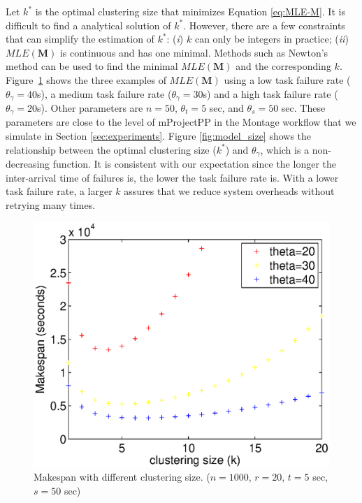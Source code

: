\documentclass{IOS-Book-Article}
\begin{document}
Let $k^*$ is the optimal clustering size that minimizes Equation \ref{eq:MLE-M}.  It is difficult to find a analytical solution of $k^*$. However, there are a few constraints that can simplify the estimation of $k^*$: (\emph{i}) $k$ can only be integers in practice; (\emph{ii}) $MLE(\bm{M})$ is continuous and has one minimal. Methods such as Newton's method can be used to find the minimal $MLE(\bm{M})$ and the corresponding $k$. Figure~\ref{fig:model_makespan} shows the three examples of $MLE(\bm{M})$ using a low task failure rate ($\theta_{\gamma}=40$s), a medium task failure rate ($\theta_{\gamma}=30$s) and a high task failure rate ($\theta_{\gamma}=20$s). Other parameters are $n=50$, $\theta_{t}=5$ sec, and $\theta_{s}=50$ sec. These parameters are close to the level of mProjectPP in the Montage workflow that we simulate in Section \ref{sec:experiments}. 
Figure \ref{fig:model_size} shows the relationship between the optimal clustering size ($k^*$) and $\theta_{\gamma}$, which is a non-decreasing function. It is consistent with our expectation since the longer the inter-arrival time of failures is, the lower the task failure rate is. With a lower task failure rate, a larger $k$ assures that we reduce system overheads without retrying many times.  



\begin{figure}[!htb]
\centering
  \includegraphics[width=0.75\linewidth]{figure5.eps}
  \caption{Makespan with different clustering size. ($n=1000$, $r=20$, $t=5$ sec, $s=50$ sec)}
  \label{fig:model_makespan}
\end{figure}
\end{document}

